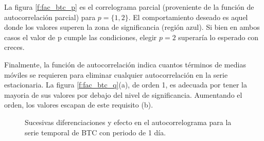 \documentclass[a4paper,10pt]{article}
\begin{document}
La figura \ref{f:fac_btc_p} es el correlograma parcial (proveniente de la función de autocorrelación parcial) para $p=\{1,2\}$. El comportamiento deseado es aquel donde los valores superen la zona de significancia (región azul). Si bien en ambos casos el valor de p cumple las condiciones, elegir $p=2$ superaría lo esperado con creces.

Finalmente, la función de autocorrelación indica cuantos términos de medias móviles se requieren para eliminar cualquier autocorrelación en la serie estacionaria. La figura \ref{f:fac_btc_q}(a), de orden 1, es adecuada por tener la mayoria de sus valores por debajo del nivel de significancia. Aumentando el orden, los valores escapan de este requisito (b).

\begin{figure}[h!]
 \centering
  \caption{Sucesivas diferenciaciones y efecto en el autocorrelograma para la serie temporal de BTC con periodo de 1 día.}
  \label{f:btc_1d_diff-fac}
\end{figure}
\end{document}
